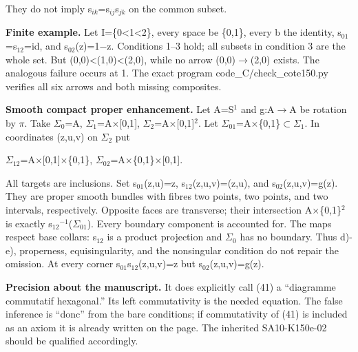 They do not imply s\ensuremath{{}_{ik}}=s\ensuremath{{}_{ij}}s\ensuremath{{}_{jk}} on the common subset.

\textbf{Finite example.} Let I=\{0\textless1\textless2\}, every space be \{0,1\}, every b the identity, s\ensuremath{{}_{01}}=s\ensuremath{{}_{12}}=id, and s\ensuremath{{}_{02}}(z)=1\ensuremath{-}z. Conditions 1--3 hold; all subsets in condition 3 are the whole set. But (0,0)\textless(1,0)\textless(2,0), while no arrow (0,0)\ensuremath{\to}(2,0) exists. The analogous failure occurs at 1. The exact program code\_C/check\_cote150.py verifies all six arrows and both missing composites.

\textbf{Smooth compact proper enhancement.} Let A=S\ensuremath{{}^{1}} and g:A\ensuremath{\to}A be rotation by \ensuremath{\pi}. Take \ensuremath{\Sigma}\ensuremath{{}_{0}}=A, \ensuremath{\Sigma}\ensuremath{{}_{1}}=A\ensuremath{\times}{[}0,1{]}, \ensuremath{\Sigma}\ensuremath{{}_{2}}=A\ensuremath{\times}{[}0,1{]}\ensuremath{{}^{2}}. Let \ensuremath{\Sigma}\ensuremath{{}_{01}}=A\ensuremath{\times}\{0,1\}\ensuremath{\subset}\ensuremath{\Sigma}\ensuremath{{}_{1}}. In coordinates (z,u,v) on \ensuremath{\Sigma}\ensuremath{{}_{2}} put

\ensuremath{\Sigma}\ensuremath{{}_{12}}=A\ensuremath{\times}{[}0,1{]}\ensuremath{\times}\{0,1\}, \ensuremath{\Sigma}\ensuremath{{}_{02}}=A\ensuremath{\times}\{0,1\}\ensuremath{\times}{[}0,1{]}.

All targets are inclusions. Set s\ensuremath{{}_{01}}(z,u)=z, s\ensuremath{{}_{12}}(z,u,v)=(z,u), and s\ensuremath{{}_{02}}(z,u,v)=g(z). They are proper smooth bundles with fibres two points, two points, and two intervals, respectively. Opposite faces are transverse; their intersection A\ensuremath{\times}\{0,1\}\ensuremath{{}^{2}} is exactly s\ensuremath{{}_{12}}\ensuremath{{}^{-1}}(\ensuremath{\Sigma}\ensuremath{{}_{01}}). Every boundary component is accounted for. The maps respect base collars: s\ensuremath{{}_{12}} is a product projection and \ensuremath{\Sigma}\ensuremath{{}_{0}} has no boundary. Thus d)-e), properness, equisingularity, and the nonsingular condition do not repair the omission. At every corner s\ensuremath{{}_{01}}s\ensuremath{{}_{12}}(z,u,v)=z but s\ensuremath{{}_{02}}(z,u,v)=g(z).

\textbf{Precision about the manuscript.} It does explicitly call (41) a ``diagramme commutatif hexagonal.'' Its left commutativity is the needed equation. The false inference is ``donc'' from the bare conditions; if commutativity of (41) is included as an axiom it is already written on the page. The inherited SA10-K150e-02 should be qualified accordingly.


